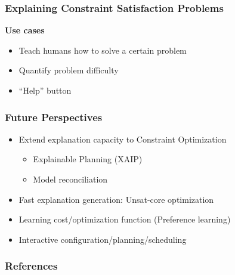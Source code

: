 \documentclass{beamer}
\begin{document}
\begin{frame}
    \frametitle{\small{Explaining Constraint Satisfaction Problems}}
    \textbf{Use cases}
    \begin{itemize}
        \item Teach humans how to solve a certain problem
        \item Quantify problem difficulty
        \item “Help” button
    \end{itemize}

\end{frame}

\begin{frame}
    \frametitle{\small{Future Perspectives}}

    \begin{itemize}
        \item Extend explanation capacity to Constraint Optimization
        \begin{itemize}
            \item Explainable Planning (XAIP)
            \item Model reconciliation    \pause     
        \end{itemize}
        \item Fast explanation generation: Unsat-core optimization\pause
        \item Learning cost/optimization function (Preference learning)\pause
        \item Interactive configuration/planning/scheduling
    \end{itemize}

\end{frame}


    



\begin{frame}
    \frametitle{References}
    \vspace{2em}
    
\end{frame}
\end{document}
